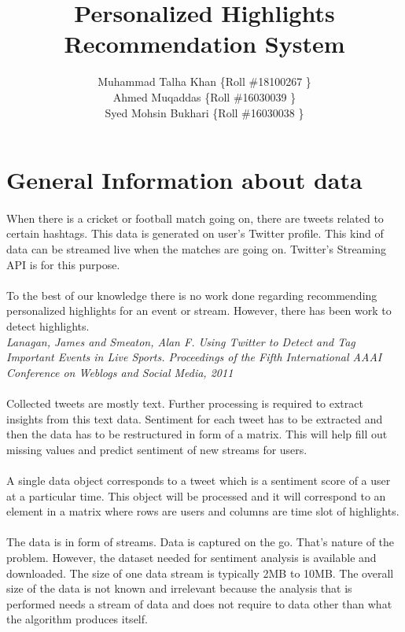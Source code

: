 \documentclass[11pt]{article}
\title{Personalized Highlights Recommendation System}
\author{Muhammad Talha Khan \{Roll \#18100267 \}\\Ahmed Muqaddas \{Roll \#16030039 \}\\Syed Mohsin Bukhari \{Roll \#16030038 \}}
\begin{document}
	\maketitle
	
\section{General Information about data}
\paragraph{}
When there is a cricket or football match going on, there are tweets related to certain hashtags. This data is generated on user's Twitter profile. This kind of data can be streamed live when the matches are going on. Twitter's Streaming API is for this purpose.
\paragraph{}
To the best of our knowledge there is no work done regarding recommending personalized highlights for an event or stream. However, there has been work to detect highlights.\\
\textit{Lanagan, James and Smeaton, Alan F. Using Twitter to Detect and Tag Important Events in Live Sports. Proceedings of the Fifth International AAAI Conference on Weblogs and Social Media, 2011}
\paragraph{}
Collected tweets are mostly text. Further processing is required to extract insights from this text data. Sentiment for each tweet has to be extracted and then the data has to be restructured in form of a matrix. This will help fill out missing values and predict sentiment of new streams for users.
\paragraph{}
A single data object corresponds to a tweet which is a sentiment score of a user at a particular time. This object will be processed and it will correspond to an element in a matrix where rows are users and columns are time slot of highlights.
\paragraph{}
The data is in form of streams. Data is captured on the go. That's nature of the problem. However, the dataset needed for sentiment analysis is available and downloaded. The size of one data stream is typically 2MB to 10MB. The overall size of the data is not known and irrelevant because the analysis that is performed needs a stream of data and does not require to data other than what the algorithm produces itself.
\end{document}
